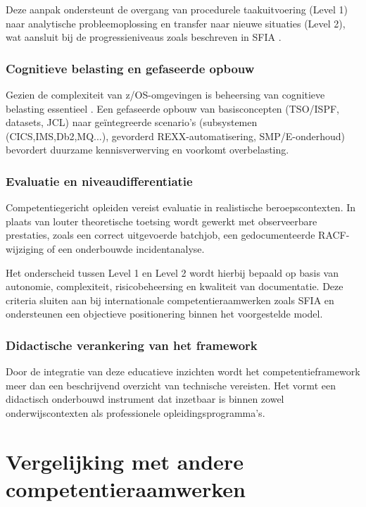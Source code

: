 Deze aanpak ondersteunt de overgang van procedurele taakuitvoering (Level 1) naar analytische probleemoplossing en transfer naar nieuwe situaties (Level 2), wat aansluit bij de progressieniveaus zoals beschreven in SFIA \autocite{sfia_framework}.

\subsubsection{Cognitieve belasting en gefaseerde opbouw}

Gezien de complexiteit van z/OS-omgevingen is beheersing van cognitieve belasting essentieel \autocite{sweller2011cognitive}. Een gefaseerde opbouw van basisconcepten (TSO/ISPF, datasets, JCL) naar geïntegreerde scenario’s (subsystemen (CICS,IMS,Db2,MQ...), gevorderd REXX-automatisering, SMP/E-onderhoud) bevordert duurzame kennisverwerving en voorkomt overbelasting.

\subsubsection{Evaluatie en niveaudifferentiatie}

Competentiegericht opleiden vereist evaluatie in realistische beroepscontexten. In plaats van louter theoretische toetsing wordt gewerkt met observeerbare prestaties, zoals een correct uitgevoerde batchjob, een gedocumenteerde RACF-wijziging of een onderbouwde incidentanalyse. \autocite{sfia_framework,eCF_framework}

Het onderscheid tussen Level 1 en Level 2 wordt hierbij bepaald op basis van autonomie, complexiteit, risicobeheersing en kwaliteit van documentatie. Deze criteria sluiten aan bij internationale competentieraamwerken zoals SFIA en ondersteunen een objectieve positionering binnen het voorgestelde model.

\subsubsection{Didactische verankering van het framework}

Door de integratie van deze educatieve inzichten wordt het competentieframework meer dan een beschrijvend overzicht van technische vereisten. Het vormt een didactisch onderbouwd instrument dat inzetbaar is binnen zowel onderwijscontexten als professionele opleidingsprogramma’s.


\section{Vergelijking met andere competentieraamwerken}
\label{sec:vergelijking-andere-compframeworks}

